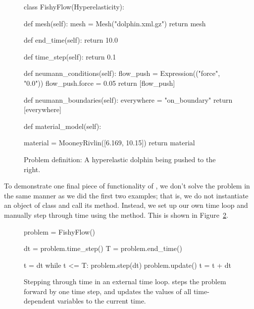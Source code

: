 \begin{figure}
\begin{python}
class FishyFlow(Hyperelasticity):

    def mesh(self):
        mesh = Mesh("dolphin.xml.gz")
        return mesh

    def end_time(self):
        return 10.0

    def time_step(self):
        return 0.1

    def neumann_conditions(self):
        flow_push = Expression(("force", "0.0"))
        flow_push.force = 0.05
        return [flow_push]

    def neumann_boundaries(self):
        everywhere = "on_boundary"
        return [everywhere]

    def material_model(self):

        material = MooneyRivlin([6.169, 10.15])
        return material
\end{python}
\caption{Problem definition: A hyperelastic dolphin being pushed to
  the right.}
\label{code:narayanan:fishyflow}
\end{figure}

To demonstrate one final piece of functionality of \twist, we don't
solve the problem in the same manner as we did the first two examples;
that is, we do not instantiate an object of class  and
call its  method. Instead, we set up our own time loop
and manually step through time using the  method. This is
shown in Figure~\ref{code:narayanan:manualstep}.

\begin{figure}
\begin{python}
problem = FishyFlow()

dt = problem.time_step()
T = problem.end_time()

t = dt
while t <= T:
    problem.step(dt)
    problem.update()
    t = t + dt
\end{python}
\caption{Stepping through time in an external time loop. 
  steps the problem forward by one time step, and 
  updates the values of all time-dependent variables to the current time.}
\label{code:narayanan:manualstep}
\end{figure}

